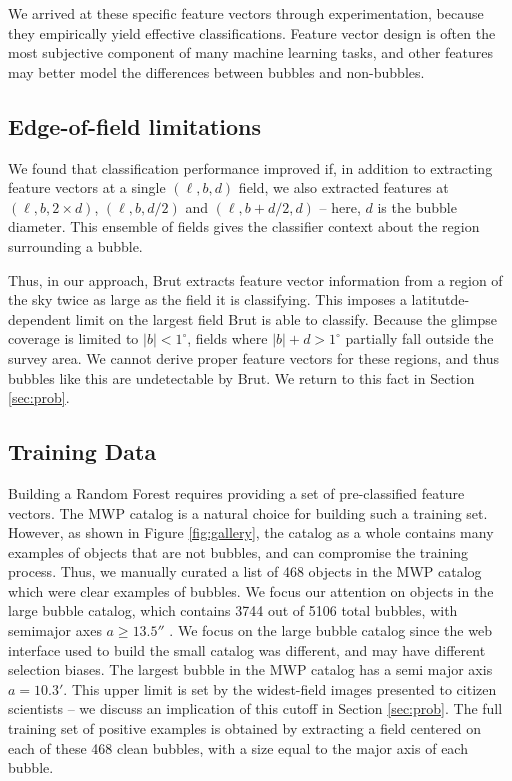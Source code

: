 \documentclass[preprint]{aastex}
\begin{document}
We arrived at these specific feature vectors through experimentation, because they empirically yield effective classifications. Feature vector design is often the most subjective component of many machine learning tasks, and other features may better model the differences between bubbles and non-bubbles. 

\subsection{Edge-of-field limitations}
\label{sec:feature_edges}
We found that classification performance improved if, in addition to extracting feature vectors at a single $(\ell, b, d)$ field, we also extracted features at $(\ell, b, 2 \times d)$, $(\ell, b, d / 2)$ and $(\ell, b + d/ 2, d)$ -- here, $d$ is the bubble diameter. This ensemble of fields gives the classifier context about the region surrounding a bubble.

Thus, in our approach, Brut extracts feature vector information from a region of the sky twice as large as the field it is classifying. This imposes a latitutde-dependent limit on the largest field Brut is able to classify. Because the {\sc glimpse} coverage is limited to $|b| < 1^\circ$, fields where $|b| + d > 1^\circ$ partially fall outside the survey area. We cannot derive proper feature vectors for these regions, and thus bubbles like this are undetectable by Brut. We return to this fact in Section \ref{sec:prob}.


\subsection{Training Data}
\label{sec:method_training_data}

Building a Random Forest requires providing a set of pre-classified feature vectors. The MWP catalog is a natural choice for building such a training set. However, as shown in Figure \ref{fig:gallery}, the catalog as a whole contains many examples of objects that are not bubbles, and can compromise the training process. Thus, we manually curated a list of 468 objects in the MWP catalog which were clear examples of bubbles. We focus our attention on objects in the large bubble catalog, which contains 3744 out of 5106 total bubbles, with semimajor axes  $a \geq 13.5''$  \citep{Simpson12}. We focus on the large bubble catalog since the web interface used to build the small catalog was different, and may have different selection biases. The largest bubble in the MWP catalog has a semi major axis $a=10.3'$. This upper limit is set by the widest-field images presented to citizen scientists -- we discuss an implication of this cutoff in Section \ref{sec:prob}. The full training set of positive examples is obtained by extracting a field centered on each of these 468 clean bubbles, with a size equal to the major axis of each bubble. 
\end{document}
